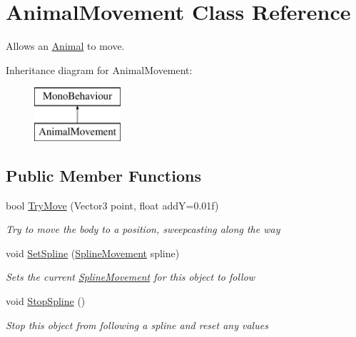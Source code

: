 \hypertarget{class_animal_movement}{}\section{Animal\+Movement Class Reference}
\label{class_animal_movement}


Allows an \mbox{\hyperlink{class_animal}{Animal}} to move.  


Inheritance diagram for Animal\+Movement\+:\begin{figure}[H]
\begin{center}
\leavevmode
\includegraphics[height=2.000000cm]{class_animal_movement}
\end{center}
\end{figure}
\subsection*{Public Member Functions}
\begin{DoxyCompactItemize}
\item 
bool \mbox{\hyperlink{class_animal_movement_a95055592a16686acb6ff78fc5b59f9e7}{Try\+Move}} (Vector3 point, float addY=0.\+01f)
\begin{DoxyCompactList}\small\item\em Try to move the body to a position, sweepcasting along the way \end{DoxyCompactList}\item 
void \mbox{\hyperlink{class_animal_movement_a7da29b5a06c968139cb342c2508d9cc7}{Set\+Spline}} (\mbox{\hyperlink{class_spline_movement}{Spline\+Movement}} spline)
\begin{DoxyCompactList}\small\item\em Sets the current \mbox{\hyperlink{class_spline_movement}{Spline\+Movement}} for this object to follow \end{DoxyCompactList}\item 
void \mbox{\hyperlink{class_animal_movement_a920df529c4783a9adccd1f4fca9bb1b2}{Stop\+Spline}} ()
\begin{DoxyCompactList}\small\item\em Stop this object from following a spline and reset any values \end{DoxyCompactList}\end{DoxyCompactItemize}
